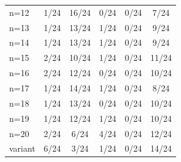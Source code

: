 \begin{tabular}{lccccc}
n=12 & \cellcolor[HTML]{FFFFFF} 1/24 & \cellcolor[HTML]{EA4646} 16/24 & \cellcolor[HTML]{9670BD} 0/24 & \cellcolor[HTML]{8FEB32} 0/24 & \cellcolor[HTML]{19C8C8} 7/24 \\
n=13 & \cellcolor[HTML]{FFFFFF} 1/24 & \cellcolor[HTML]{EA4646} 13/24 & \cellcolor[HTML]{9670BD} 1/24 & \cellcolor[HTML]{8FEB32} 0/24 & \cellcolor[HTML]{19C8C8} 9/24 \\
n=14 & \cellcolor[HTML]{FFFFFF} 1/24 & \cellcolor[HTML]{EA4646} 13/24 & \cellcolor[HTML]{9670BD} 1/24 & \cellcolor[HTML]{8FEB32} 0/24 & \cellcolor[HTML]{19C8C8} 9/24 \\
n=15 & \cellcolor[HTML]{FFFFFF} 2/24 & \cellcolor[HTML]{EA4646} 10/24 & \cellcolor[HTML]{9670BD} 1/24 & \cellcolor[HTML]{8FEB32} 0/24 & \cellcolor[HTML]{19C8C8} 11/24 \\
n=16 & \cellcolor[HTML]{FFFFFF} 2/24 & \cellcolor[HTML]{EA4646} 12/24 & \cellcolor[HTML]{9670BD} 0/24 & \cellcolor[HTML]{8FEB32} 0/24 & \cellcolor[HTML]{19C8C8} 10/24 \\
n=17 & \cellcolor[HTML]{FFFFFF} 1/24 & \cellcolor[HTML]{EA4646} 14/24 & \cellcolor[HTML]{9670BD} 1/24 & \cellcolor[HTML]{8FEB32} 0/24 & \cellcolor[HTML]{19C8C8} 8/24 \\
n=18 & \cellcolor[HTML]{FFFFFF} 1/24 & \cellcolor[HTML]{EA4646} 13/24 & \cellcolor[HTML]{9670BD} 0/24 & \cellcolor[HTML]{8FEB32} 0/24 & \cellcolor[HTML]{19C8C8} 10/24 \\
n=19 & \cellcolor[HTML]{FFFFFF} 1/24 & \cellcolor[HTML]{EA4646} 12/24 & \cellcolor[HTML]{9670BD} 1/24 & \cellcolor[HTML]{8FEB32} 0/24 & \cellcolor[HTML]{19C8C8} 10/24 \\
n=20 & \cellcolor[HTML]{FFFFFF} 2/24 & \cellcolor[HTML]{EA4646} 6/24 & \cellcolor[HTML]{9670BD} 4/24 & \cellcolor[HTML]{8FEB32} 0/24 & \cellcolor[HTML]{19C8C8} 12/24 \\
variant & \cellcolor[HTML]{FFFFFF} 6/24 & \cellcolor[HTML]{EA4646} 3/24 & \cellcolor[HTML]{9670BD} 1/24 & \cellcolor[HTML]{8FEB32} 0/24 & \cellcolor[HTML]{19C8C8} 14/24 \\
\bottomrule
\end{tabular}
